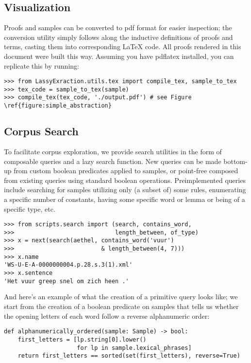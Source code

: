 \subsection{Visualization}
Proofs and samples can be converted to pdf format for easier inspection; the conversion utility simply follows along the inductive definitions of proofs and terms, casting them into corresponding \LaTeX{} code.
All proofs rendered in this document were built this way.
Assuming you have pdflatex installed, you can replicate this by running:
\begin{verbatim}
>>> from LassyExraction.utils.tex import compile_tex, sample_to_tex
>>> tex_code = sample_to_tex(sample)
>>> compile_tex(tex_code, './output.pdf') # see Figure \ref{figure:simple_abstraction}
\end{verbatim}

\subsection{Corpus Search}
To facilitate corpus exploration, we provide search utilities in the form of composable queries and a lazy search function.
New queries can be made bottom-up from custom boolean predicates applied to samples, or point-free composed from existing queries using standard boolean operations.
Preimplemented queries include searching for samples utilizing only (a subset of) some rules, enumerating a specific number of constants, having some specific word or lemma or being of a specific type, etc.

\begin{verbatim}
>>> from scripts.search import (search, contains_word,
>>>                             length_between, of_type)
>>> x = next(search(aethel, contains_word('vuur')  
>>>                         & length_between(4, 7)))
>>> x.name
'WS-U-E-A-0000000004.p.28.s.3(1).xml'
>>> x.sentence
'Het vuur greep snel om zich heen .'
\end{verbatim}

\noindent And here's an example of what the creation of a primitive query looks like; we start from the creation of a boolean predicate on samples that tells us whether the opening letters of each word follow a reverse alphanumeric order:
\begin{verbatim}
def alphanumerically_ordered(sample: Sample) -> bool:
    first_letters = [lp.string[0].lower() 
                     for lp in sample.lexical_phrases]
    return first_letters == sorted(set(first_letters), reverse=True)
\end{verbatim}

